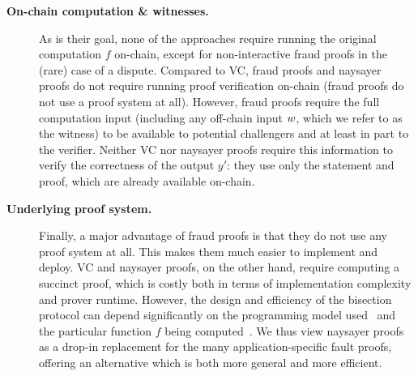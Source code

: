 \begin{description}
   \item[\textbf{On-chain computation \& witnesses.}]
   As is their goal, none of the approaches require running the original computation $f$ on-chain, except for non-interactive fraud proofs in the (rare) case of a dispute. 
   Compared to VC, fraud proofs and naysayer proofs do not require running proof verification on-chain (fraud proofs do not use a proof system at all).
   However, fraud proofs require the full computation input (including any off-chain input $w$, which we refer to as the witness) to be available to potential challengers and at least in part to the verifier.
   Neither VC nor naysayer proofs require this information to verify the correctness of the output $y'$: they use only the statement and proof, which are already available on-chain.

   \item[\textbf{Underlying proof system.}]
   Finally, a major advantage of fraud proofs is that they do not use any proof system at all. This makes them much easier to implement and deploy. VC and naysayer proofs, on the other hand, require computing a succinct proof, which is costly both in terms of implementation complexity and prover runtime. %
   However, the design and efficiency of the bisection protocol can depend significantly on the programming model used~\cite{USENIX:KGCWF18} and the particular function $f$ being computed~\cite{PooDry16,PooBut17,EPRINT:SNBB19,EPRINT:SJSW19}.
   We thus view naysayer proofs as a drop-in replacement for the many application-specific fault proofs, offering an alternative which is both more general and more efficient.
\end{description}